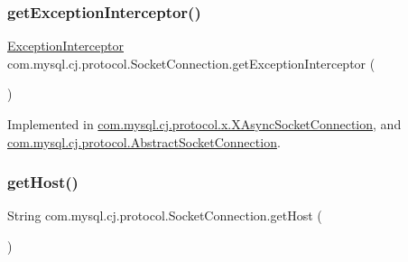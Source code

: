 \mbox{\label{interfacecom_1_1mysql_1_1cj_1_1protocol_1_1_socket_connection_a4d5027b36a3d4147c685c2a3326fd153}} 
\subsubsection{\texorpdfstring{get\+Exception\+Interceptor()}{getExceptionInterceptor()}}
{\footnotesize\ttfamily \mbox{\hyperlink{interfacecom_1_1mysql_1_1cj_1_1exceptions_1_1_exception_interceptor}{Exception\+Interceptor}} com.\+mysql.\+cj.\+protocol.\+Socket\+Connection.\+get\+Exception\+Interceptor (\begin{DoxyParamCaption}{ }\end{DoxyParamCaption})}



Implemented in \mbox{\hyperlink{classcom_1_1mysql_1_1cj_1_1protocol_1_1x_1_1_x_async_socket_connection_a6cb71da85c0faf8459c9cc9ef3845759}{com.\+mysql.\+cj.\+protocol.\+x.\+X\+Async\+Socket\+Connection}}, and \mbox{\hyperlink{classcom_1_1mysql_1_1cj_1_1protocol_1_1_abstract_socket_connection_aa8c3a29041cab7f202c842e456104a5b}{com.\+mysql.\+cj.\+protocol.\+Abstract\+Socket\+Connection}}.

\mbox{\label{interfacecom_1_1mysql_1_1cj_1_1protocol_1_1_socket_connection_a1fa2cc5cddf0b92a9f19472924aa6e61}} 
\subsubsection{\texorpdfstring{get\+Host()}{getHost()}}
{\footnotesize\ttfamily String com.\+mysql.\+cj.\+protocol.\+Socket\+Connection.\+get\+Host (\begin{DoxyParamCaption}{ }\end{DoxyParamCaption})}

